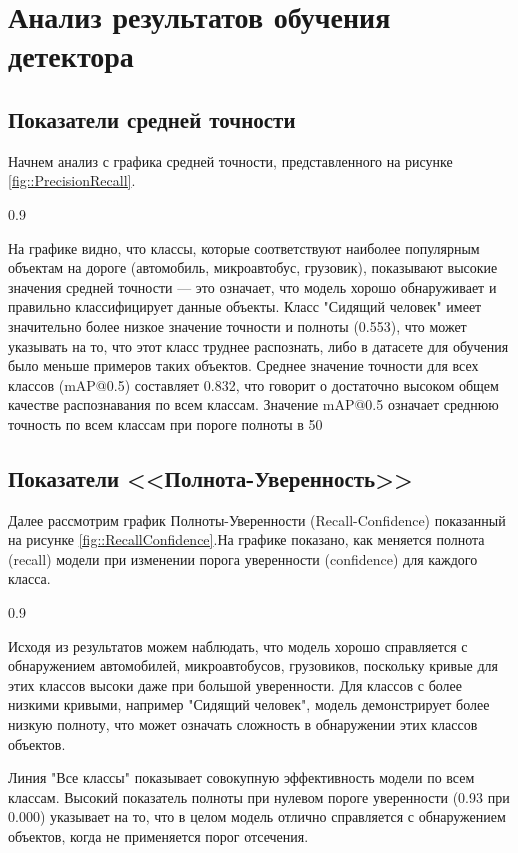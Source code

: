 \section{Анализ результатов обучения детектора}
\subsection{Показатели средней точности}

Начнем анализ с графика средней точности, представленного на рисунке 
\ref{fig::PrecisionRecall}.

{0.9}

На графике видно, что классы, которые соответствуют наиболее популярным объектам
на дороге (автомобиль, микроавтобус, грузовик), показывают высокие значения 
средней точности --- это означает, что модель хорошо обнаруживает и правильно 
классифицирует данные объекты. Класс "Сидящий человек" имеет значительно более
низкое значение точности и полноты (0.553), что может указывать на то, что этот
класс труднее распознать, либо в датасете для обучения было меньше примеров таких
объектов. Среднее значение точности для всех классов (mAP@0.5) составляет 0.832,
что говорит о достаточно высоком общем качестве распознавания по всем классам.
Значение mAP@0.5 означает среднюю точность по всем классам при пороге полноты в 50%

\subsection{Показатели <<Полнота-Уверенность>>}

Далее рассмотрим график Полноты-Уверенности (Recall-Confidence) показанный на 
рисунке \ref{fig::RecallConfidence}.На графике показано, как меняется полнота
(recall) модели при изменении порога уверенности (confidence) для каждого класса.

{0.9}

Исходя из результатов можем наблюдать, что модель хорошо справляется с обнаружением
автомобилей, микроавтобусов, грузовиков, поскольку кривые для этих классов высоки
даже при большой уверенности. Для классов с более низкими кривыми, например "Сидящий
человек", модель демонстрирует более низкую полноту, что может означать сложность в
обнаружении этих классов объектов.

Линия "Все классы" показывает совокупную эффективность модели по всем классам.
Высокий показатель полноты при нулевом пороге уверенности (0.93 при 0.000) указывает
на то, что в целом модель отлично справляется с обнаружением объектов, когда не
применяется порог отсечения.

